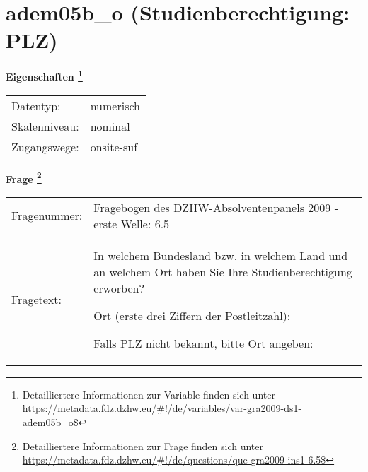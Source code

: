 
    \setcounter{footnote}{0}

    \vspace*{-1.8cm}
	\section{adem05b\_o (Studienberechtigung: PLZ)}
	\label{section:adem05b_o}



    \vspace*{0.5cm}
    \noindent\textbf{Eigenschaften
	\footnote{Detailliertere Informationen zur Variable finden sich unter
		\url{https://metadata.fdz.dzhw.eu/\#!/de/variables/var-gra2009-ds1-adem05b_o$}}}\\
	\begin{tabularx}{\hsize}{@{}lX}
	Datentyp: & numerisch \\
	Skalenniveau: & nominal \\
	Zugangswege: &
	  onsite-suf
 \\
    \end{tabularx}



				\vspace*{0.5cm}
                \noindent\textbf{Frage
	                \footnote{Detailliertere Informationen zur Frage finden sich unter
		              \url{https://metadata.fdz.dzhw.eu/\#!/de/questions/que-gra2009-ins1-6.5$}}}\\
				\begin{tabularx}{\hsize}{@{}lX}
					Fragenummer: &
					  Fragebogen des DZHW-Absolventenpanels 2009 - erste Welle:
					  6.5
 \\
					Fragetext: & In welchem Bundesland bzw. in welchem Land und an welchem Ort haben Sie Ihre Studienberechtigung erworben?\par  Ort (erste drei Ziffern der Postleitzahl):\par  Falls PLZ nicht bekannt, bitte Ort angeben: \\
				\end{tabularx}





